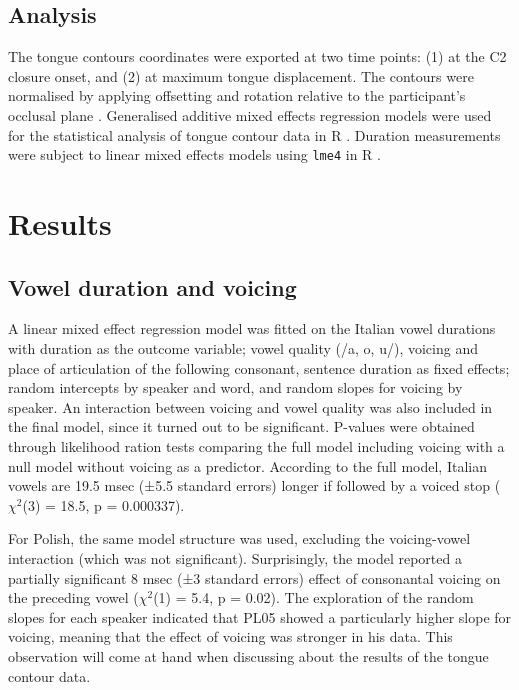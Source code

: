 \documentclass[authoryear, twocolumn]{elsarticle}
\begin{document}
\subsection{Analysis}\label{analysis}

The tongue contours coordinates were exported at two time points: (1) at
the C2 closure onset, and (2) at maximum tongue displacement. The
contours were normalised by applying offsetting and rotation relative to
the participant's occlusal plane \citep{scobbie2011}. Generalised
additive mixed effects regression models \citep{wood2006} were used for
the statistical analysis of tongue contour data in R
\citep{r-core-team2017}. Duration measurements were subject to linear
mixed effects models using \texttt{lme4} in R \citep{bates2015}.

\section{Results}\label{results}

\subsection{Vowel duration and
voicing}\label{vowel-duration-and-voicing}

A linear mixed effect regression model was fitted on the Italian vowel
durations with duration as the outcome variable; vowel quality (/a, o,
u/), voicing and place of articulation of the following consonant,
sentence duration as fixed effects; random intercepts by speaker and
word, and random slopes for voicing by speaker. An interaction between
voicing and vowel quality was also included in the final model, since it
turned out to be significant. P-values were obtained through likelihood
ration tests comparing the full model including voicing with a null
model without voicing as a predictor. According to the full model,
Italian vowels are 19.5 msec (±5.5 standard errors) longer if followed
by a voiced stop (\(\chi^2\)(3) = 18.5, p = 0.000337).

For Polish, the same model structure was used, excluding the
voicing-vowel interaction (which was not significant). Surprisingly, the
model reported a partially significant 8 msec (±3 standard errors)
effect of consonantal voicing on the preceding vowel (\(\chi^2\)(1) =
5.4, p = 0.02). The exploration of the random slopes for each speaker
indicated that PL05 showed a particularly higher slope for voicing,
meaning that the effect of voicing was stronger in his data. This
observation will come at hand when discussing about the results of the
tongue contour data.
\end{document}
